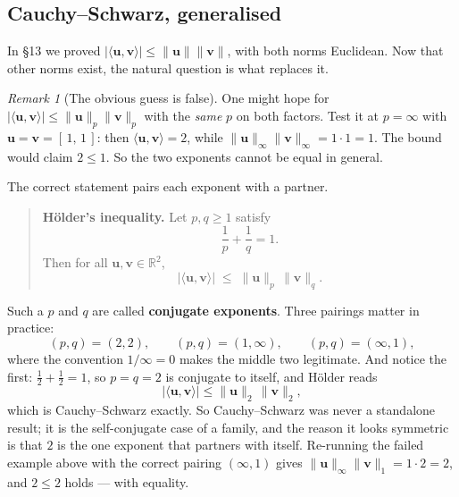 \documentclass[11pt]{article}
\theoremstyle{definition}
\theoremstyle{remark}
\newtheorem*{rmk}{Remark}
\newcommand{\R}{\mathbb{R}}
\newcommand{\vc}[1]{\mathbf{#1}}
\newcommand{\norm}[1]{\lVert #1\rVert}
\begin{document}
\subsection{Cauchy--Schwarz, generalised}
In \S13 we proved
$\lvert\langle\vc{u},\vc{v}\rangle\rvert\le\norm{\vc{u}}\norm{\vc{v}}$, with both
norms Euclidean. Now that other norms exist, the natural question is what
replaces it.

\begin{rmk}[The obvious guess is false]
One might hope for
$\lvert\langle\vc{u},\vc{v}\rangle\rvert\le\norm{\vc{u}}_p\norm{\vc{v}}_p$ with
the \emph{same} $p$ on both factors. Test it at $p=\infty$ with
$\vc{u}=\vc{v}=[\,1,\,1\,]$: then $\langle\vc{u},\vc{v}\rangle=2$, while
$\norm{\vc{u}}_\infty\norm{\vc{v}}_\infty=1\cdot1=1$. The bound would claim
$2\le1$. So the two exponents cannot be equal in general.
\end{rmk}

\noindent The correct statement pairs each exponent with a partner.

\begin{quote}
\textbf{H\"older's inequality.} Let $p,q\ge1$ satisfy
\[
  \frac{1}{p}+\frac{1}{q} = 1 .
\]
Then for all $\vc{u},\vc{v}\in\R^{2}$,
\[
  \bigl\lvert\langle\vc{u},\vc{v}\rangle\bigr\rvert
  \;\le\; \norm{\vc{u}}_p\,\norm{\vc{v}}_q .
\]
\end{quote}

\noindent Such a $p$ and $q$ are called \textbf{conjugate exponents}. Three
pairings matter in practice:
\[
  (p,q)=(2,2), \qquad (p,q)=(1,\infty), \qquad (p,q)=(\infty,1),
\]
where the convention $1/\infty=0$ makes the middle two legitimate. And notice
the first: $\tfrac12+\tfrac12=1$, so $p=q=2$ is conjugate to itself, and
H\"older reads
\[
  \bigl\lvert\langle\vc{u},\vc{v}\rangle\bigr\rvert
  \le \norm{\vc{u}}_2\,\norm{\vc{v}}_2 ,
\]
which is Cauchy--Schwarz exactly. So Cauchy--Schwarz was never a standalone
result; it is the self-conjugate case of a family, and the reason it looks
symmetric is that $2$ is the one exponent that partners with itself. Re-running
the failed example above with the correct pairing $(\infty,1)$ gives
$\norm{\vc{u}}_\infty\norm{\vc{v}}_1=1\cdot2=2$, and $2\le2$ holds --- with
equality.

\end{document}

